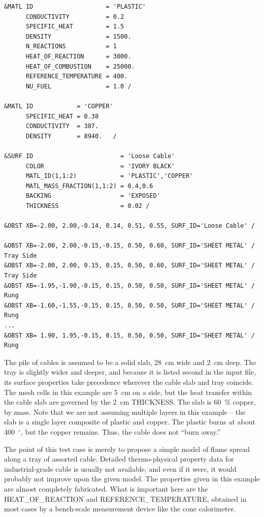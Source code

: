 \documentclass[11pt]{book}
\begin{document}
\footnotesize
\begin{verbatim}
&MATL ID                    = 'PLASTIC'
      CONDUCTIVITY          = 0.2
      SPECIFIC_HEAT         = 1.5
      DENSITY               = 1500.
      N_REACTIONS           = 1
      HEAT_OF_REACTION      = 3000.
      HEAT_OF_COMBUSTION    = 25000.
      REFERENCE_TEMPERATURE = 400.
      NU_FUEL               = 1.0 /

&MATL ID            = 'COPPER'
      SPECIFIC_HEAT = 0.38
      CONDUCTIVITY  = 387.
      DENSITY       = 8940.   /

&SURF ID                        = 'Loose Cable'
      COLOR                     = 'IVORY BLACK'
      MATL_ID(1,1:2)            = 'PLASTIC','COPPER'
      MATL_MASS_FRACTION(1,1:2) = 0.4,0.6
      BACKING                   = 'EXPOSED'
      THICKNESS                 = 0.02 /

&OBST XB=-2.00, 2.00,-0.14, 0.14, 0.51, 0.55, SURF_ID='Loose Cable' /

&OBST XB=-2.00, 2.00,-0.15,-0.15, 0.50, 0.60, SURF_ID='SHEET METAL' / Tray Side
&OBST XB=-2.00, 2.00, 0.15, 0.15, 0.50, 0.60, SURF_ID='SHEET METAL' / Tray Side
&OBST XB=-1.95,-1.90,-0.15, 0.15, 0.50, 0.50, SURF_ID='SHEET METAL' / Rung
&OBST XB=-1.60,-1.55,-0.15, 0.15, 0.50, 0.50, SURF_ID='SHEET METAL' / Rung
...
&OBST XB= 1.90, 1.95,-0.15, 0.15, 0.50, 0.50, SURF_ID='SHEET METAL' / Rung
\end{verbatim} \normalsize

\noindent
The pile of cables is assumed to be a solid slab, 28~cm wide and 2~cm deep. The tray is slightly wider and deeper, and because it is listed second in
the input file, its surface properties take precedence wherever the cable slab and tray coincide. The mesh cells in this example are 5~cm on a side, but the
heat transfer within the cable slab are governed by the 2~cm {\ct THICKNESS}. The slab is 60~\% copper, by mass. Note that we are not assuming multiple
layers in this example -- the slab is a single layer composite of plastic and copper. The plastic burns at about 400~$^\circ$, but the copper remains. Thus,
the cable does not ``burn away.''

The point of this test case is merely to propose a simple model of flame spread along a tray of assorted cable. Detailed thermo-physical property data for
industrial-grade cable is usually not available, and even if it were, it would probably not improve upon the given model. The properties given in this example
are almost completely fabricated. What is important here are the
{\ct HEAT\_OF\_REACTION} and {\ct REFERENCE\_TEMPERATURE}, obtained in most cases by a bench-scale measurement device like the cone calorimeter.
\end{document}
